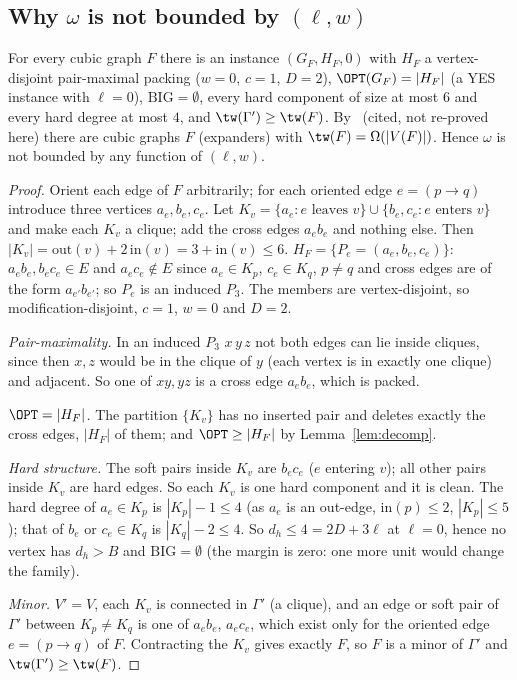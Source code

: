 \subsection{Why \texorpdfstring{$\omega$}{omega} is not bounded by \texorpdfstring{$(\ell,w)$}{(l,w)}}
\begin{proposition}[$\omega$ is unbounded at $\ell=0$, $w=0$]\label{prop:expander}
For every cubic graph $F$ there is an instance $(G_F,H_F,0)$ with $H_F$ a vertex-disjoint pair-maximal packing ($w=0$, $c=1$, $D=2$), $\OPT(G_F)=|H_F|$ (a YES instance with $\ell=0$), $\mathrm{BIG}=\emptyset$, every hard component of size at most $6$ and every hard degree at most $4$, and $\tw(\Gamma')\ge\tw(F)$. By~\cite{GM09} (cited, not re-proved here) there are cubic graphs $F$ (expanders) with $\tw(F)=\Omega(|V(F)|)$. Hence $\omega$ is not bounded by any function of $(\ell,w)$.
\end{proposition}
\begin{proof}
Orient each edge of $F$ arbitrarily; for each oriented edge $e=(p\to q)$ introduce three vertices $a_e,b_e,c_e$. Let $K_v=\{a_e:e\text{ leaves }v\}\cup\{b_e,c_e:e\text{ enters }v\}$ and make each $K_v$ a clique; add the cross edges $a_eb_e$ and nothing else. Then $|K_v|=\mathrm{out}(v)+2\,\mathrm{in}(v)=3+\mathrm{in}(v)\le6$. $H_F=\{P_e=(a_e,b_e,c_e)\}$: $a_eb_e,b_ec_e\in E$ and $a_ec_e\notin E$ since $a_e\in K_p$, $c_e\in K_q$, $p\ne q$ and cross edges are of the form $a_{e'}b_{e'}$; so $P_e$ is an induced $P_3$. The members are vertex-disjoint, so modification-disjoint, $c=1$, $w=0$ and $D=2$.

\emph{Pair-maximality.} In an induced $P_3$ $x\,y\,z$ not both edges can lie inside cliques, since then $x,z$ would be in the clique of $y$ (each vertex is in exactly one clique) and adjacent. So one of $xy,yz$ is a cross edge $a_eb_e$, which is packed.

\emph{$\OPT=|H_F|$.} The partition $\{K_v\}$ has no inserted pair and deletes exactly the cross edges, $|H_F|$ of them; and $\OPT\ge|H_F|$ by Lemma~\ref{lem:decomp}.

\emph{Hard structure.} The soft pairs inside $K_v$ are $b_ec_e$ ($e$ entering $v$); all other pairs inside $K_v$ are hard edges. So each $K_v$ is one hard component and it is clean. The hard degree of $a_e\in K_p$ is $|K_p|-1\le4$ (as $a_e$ is an out-edge, $\mathrm{in}(p)\le2$, $|K_p|\le5$); that of $b_e$ or $c_e\in K_q$ is $|K_q|-2\le4$. So $d_h\le4=2D+3\ell$ at $\ell=0$, hence no vertex has $d_h>B$ and $\mathrm{BIG}=\emptyset$ (the margin is zero: one more unit would change the family).

\emph{Minor.} $V'=V$, each $K_v$ is connected in $\Gamma'$ (a clique), and an edge or soft pair of $\Gamma'$ between $K_p\ne K_q$ is one of $a_eb_e$, $a_ec_e$, which exist only for the oriented edge $e=(p\to q)$ of $F$. Contracting the $K_v$ gives exactly $F$, so $F$ is a minor of $\Gamma'$ and $\tw(\Gamma')\ge\tw(F)$.
\end{proof}
